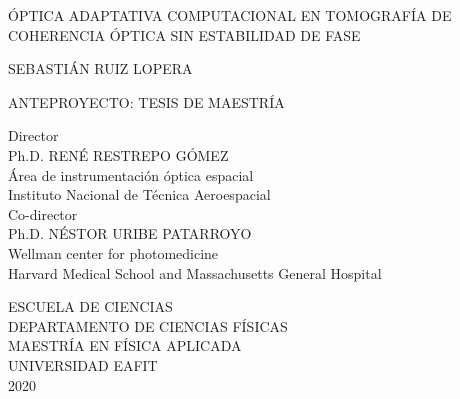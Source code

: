 \documentclass[letter, 12 pt]{article}
\begin{document}
\setlength\parindent{0pt}
\renewcommand{\contentsname}{Contenido}	%
\renewcommand{\listtablename}{Índice de tablas}
\renewcommand{\tablename}{Tabla}	%
\renewcommand{\refname}{REFERENCIAS}

\sectionfont{\fontsize{12}{1}\selectfont\centering}
\subsectionfont{\fontsize{12}{1}\selectfont}
\thispagestyle{empty}

\begin{center}


ÓPTICA ADAPTATIVA COMPUTACIONAL EN TOMOGRAFÍA DE COHERENCIA ÓPTICA SIN ESTABILIDAD DE FASE
\vfill

SEBASTIÁN RUIZ LOPERA
\vfill

ANTEPROYECTO: TESIS DE MAESTRÍA
\vfill

Director \\
Ph.D. RENÉ RESTREPO GÓMEZ \\
Área de instrumentación óptica espacial \\
Instituto Nacional de Técnica Aeroespacial \\
\vspace{\baselineskip}
Co-director \\
Ph.D. NÉSTOR URIBE PATARROYO \\
Wellman center for photomedicine \\
Harvard Medical School and Massachusetts General Hospital \\
\vfill

ESCUELA DE CIENCIAS \\
DEPARTAMENTO DE CIENCIAS FÍSICAS \\
MAESTRÍA EN FÍSICA APLICADA \\ 
UNIVERSIDAD EAFIT \\
2020
\end{center}

\thispagestyle{empty}
\newpage


\leavevmode\thispagestyle{empty}\newpage
\addtocounter{page}{-1}%
\renewcommand{\contentsname}{CONTENIDO}
\tableofcontents
\newpage
\setcounter{page}{3}

\end{document}
